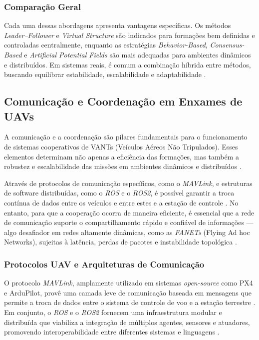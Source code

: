 \documentclass[portuguese]{sbcreviews-2025}%
\begin{document}
\subsubsection*{Comparação Geral}

Cada uma dessas abordagens apresenta vantagens específicas. Os métodos \textit{Leader–Follower} e \textit{Virtual Structure} são indicados para formações bem definidas e controladas centralmente, enquanto as estratégias \textit{Behavior-Based}, \textit{Consensus-Based} e \textit{Artificial Potential Fields} são mais adequadas para ambientes dinâmicos e distribuídos. Em sistemas reais, é comum a combinação híbrida entre métodos, buscando equilibrar estabilidade, escalabilidade e adaptabilidade \cite{bu2024advancement, ouyang2023formation}.

\subsection{Comunicação e Coordenação em Enxames de UAVs}

A comunicação e a coordenação são pilares fundamentais para o funcionamento de sistemas cooperativos de VANTs (Veículos Aéreos Não Tripulados). Esses elementos determinam não apenas a eficiência das formações, mas também a robustez e escalabilidade das missões em ambientes dinâmicos e distribuídos \cite{ren2007consensus, Young-Min2018, khaliq2021}.

Através de protocolos de comunicação específicos, como o \textit{MAVLink}, e estruturas de software distribuídas, como o \textit{ROS} e o \textit{ROS2}, é possível garantir a troca contínua de dados entre os veículos e entre estes e a estação de controle \cite{ziming2023}. No entanto, para que a cooperação ocorra de maneira eficiente, é essencial que a rede de comunicação suporte o compartilhamento rápido e confiável de informações — algo desafiador em redes altamente dinâmicas, como as \textit{FANETs} (Flying Ad hoc Networks), sujeitas à latência, perdas de pacotes e instabilidade topológica \cite{inam2017, hong2020swarm, ouyang2023formation}.

\subsubsection{Protocolos UAV e Arquiteturas de Comunicação}

O protocolo \textit{MAVLink}, amplamente utilizado em sistemas \textit{open-source} como PX4 e ArduPilot, provê uma camada leve de comunicação baseada em mensagens que permite a troca de dados entre o sistema de controle de voo e a estação terrestre \cite{Young-Min2018}. Em conjunto, o \textit{ROS} e o \textit{ROS2} fornecem uma infraestrutura modular e distribuída que viabiliza a integração de múltiplos agentes, sensores e atuadores, promovendo interoperabilidade entre diferentes sistemas e linguagens \cite{khaliq2021, ziming2023}.
\end{document}
